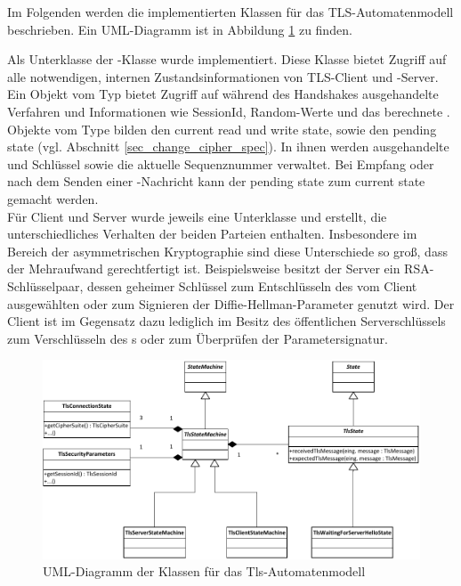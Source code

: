 
Im Folgenden werden die implementierten Klassen für das TLS-Automatenmodell beschrieben. Ein UML-Diagramm ist in Abbildung \ref{fig_uml_tls_state_machine} zu finden.

Als Unterklasse der -Klasse wurde  implementiert. Diese Klasse bietet Zugriff auf alle notwendigen, internen Zustandsinformationen von TLS-Client und -Server. Ein Objekt vom Typ  bietet Zugriff auf während des Handshakes ausgehandelte Verfahren und Informationen wie SessionId, Random-Werte und das berechnete \mastersecret{}. Objekte vom Type  bilden den current read und write state, sowie den pending state (vgl. Abschnitt \ref{sec_change_cipher_spec}). In ihnen werden ausgehandelte \ciphersuite{} und Schlüssel sowie die aktuelle Sequenznummer verwaltet. Bei Empfang oder nach dem Senden einer \changecipherspec{}-Nachricht kann der pending state zum current state gemacht werden.\\
Für Client und Server wurde jeweils eine Unterklasse  und  erstellt, die unterschiedliches Verhalten der beiden Parteien enthalten. Insbesondere im Bereich der asymmetrischen Kryptographie sind diese Unterschiede so groß, dass der Mehraufwand gerechtfertigt ist. Beispielsweise besitzt der Server ein RSA-Schlüsselpaar, dessen geheimer Schlüssel zum Entschlüsseln des vom Client ausgewählten \premastersecret{} oder zum Signieren der Diffie-Hellman-Parameter genutzt wird. Der Client ist im Gegensatz dazu lediglich im Besitz des öffentlichen Serverschlüssels zum Verschlüsseln des \premastersecret{}s oder zum Überprüfen der Parametersignatur.

\begin{figure}
	\centering
	\includegraphics[scale=0.9]{Diagrams/uml/tls_state_machine.pdf} 
	\caption{UML-Diagramm der Klassen für das Tls-Automatenmodell}
	\label{fig_uml_tls_state_machine}
\end{figure}

